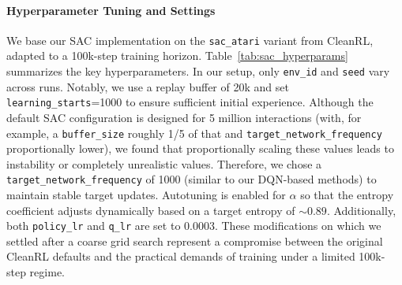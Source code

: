 \paragraph{Hyperparameter Tuning and Settings}
We base our SAC implementation on the \texttt{sac\_atari} variant from CleanRL, adapted to a 100k-step training horizon. Table~\ref{tab:sac_hyperparams} summarizes the key hyperparameters. In our setup, only \texttt{env\_id} and \texttt{seed} vary across runs. Notably, we use a replay buffer of 20k and set \texttt{learning\_starts}=1000 to ensure sufficient initial experience. Although the default SAC configuration is designed for 5 million interactions (with, for example, a \texttt{buffer\_size} roughly 1/5 of that and \verb*|target_network_frequency| proportionally lower), we found that proportionally scaling these values leads to instability or completely unrealistic values. Therefore, we chose a \verb*|target_network_frequency| of \num{1000} (similar to our DQN-based methods) to maintain stable target updates. Autotuning is enabled for $\alpha$ so that the entropy coefficient adjusts dynamically based on a target entropy of \(\sim0.89\). Additionally, both \texttt{policy\_lr} and \texttt{q\_lr} are set to 0.0003. These modifications on which we settled after a coarse grid search represent a compromise between the original CleanRL defaults and the practical demands of training under a limited 100k-step regime.

